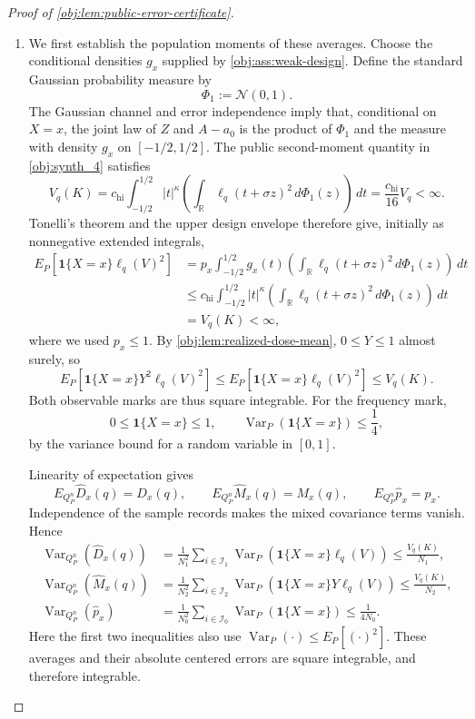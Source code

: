 \begin{proof}[Proof of \cref{obj:lem:public-error-certificate}]
\begin{enumerate}
\item
We first establish the population moments of these averages. Choose the
conditional densities \(g_x\) supplied by \cref{obj:ass:weak-design}.
Define the standard Gaussian probability measure by
\[
\Phi_1:=\mathcal N(0,1).
\]
The Gaussian channel and error independence imply that, conditional on
\(X=x\), the joint law of \(Z\) and \(A-a_0\) is the product of
\(\Phi_1\) and the measure with density \(g_x\) on \([-1/2,1/2]\).
The public second-moment quantity in \cref{obj:synth_4} satisfies
\[
V_q(K)
=c_{\mathrm{hi}}\int_{-1/2}^{1/2}|t|^\kappa
       \left(\int_{\mathbb R}\ell_q(t+\sigma z)^2\,d\Phi_1(z)\right)\,dt
=\frac{c_{\mathrm{hi}}}{16}V_q<\infty.
\]
Tonelli's theorem and the upper design envelope therefore give, initially
as nonnegative extended integrals,
\[
\begin{aligned}
E_P[\mathbf1\{X=x\}\ell_q(V)^2]
&=p_x\int_{-1/2}^{1/2}g_x(t)
       \left(\int_{\mathbb R}\ell_q(t+\sigma z)^2\,d\Phi_1(z)\right)\,dt\\
&\le c_{\mathrm{hi}}\int_{-1/2}^{1/2}|t|^\kappa
       \left(\int_{\mathbb R}\ell_q(t+\sigma z)^2\,d\Phi_1(z)\right)\,dt\\
&=V_q(K)<\infty,
\end{aligned}
\]
where we used \(p_x\le1\).
By \cref{obj:lem:realized-dose-mean}, \(0\le Y\le1\) almost surely, so
\[
E_P[\mathbf1\{X=x\}Y^2\ell_q(V)^2]
\le E_P[\mathbf1\{X=x\}\ell_q(V)^2]
\le V_q(K).
\]
Both observable marks are thus square integrable. For the frequency mark,
\[
0\le\mathbf1\{X=x\}\le1,
\qquad
\operatorname{Var}_P(\mathbf1\{X=x\})\le\frac14,
\]
by the variance bound for a random variable in \([0,1]\).

Linearity of expectation gives
\[
E_{Q_P^n}\widehat D_x(q)=D_x(q),\qquad
E_{Q_P^n}\widehat M_x(q)=M_x(q),\qquad
E_{Q_P^n}\widehat p_x=p_x.
\]
Independence of the sample records makes the mixed covariance terms vanish.
Hence
\[
\begin{aligned}
\operatorname{Var}_{Q_P^n}(\widehat D_x(q))
&=\frac1{N_1^2}\sum_{i\in\mathcal I_1}
  \operatorname{Var}_P(\mathbf1\{X=x\}\ell_q(V))
\le\frac{V_q(K)}{N_1},\\
\operatorname{Var}_{Q_P^n}(\widehat M_x(q))
&=\frac1{N_2^2}\sum_{i\in\mathcal I_2}
  \operatorname{Var}_P(\mathbf1\{X=x\}Y\ell_q(V))
\le\frac{V_q(K)}{N_2},\\
\operatorname{Var}_{Q_P^n}(\widehat p_x)
&=\frac1{N_0^2}\sum_{i\in\mathcal I_0}
  \operatorname{Var}_P(\mathbf1\{X=x\})
\le\frac1{4N_0}.
\end{aligned}
\]
Here the first two inequalities also use
\(\operatorname{Var}_P(\cdot)\le E_P[(\cdot)^2]\).
These averages and their absolute centered errors are square integrable,
and therefore integrable.


\end{enumerate}
\end{proof}
